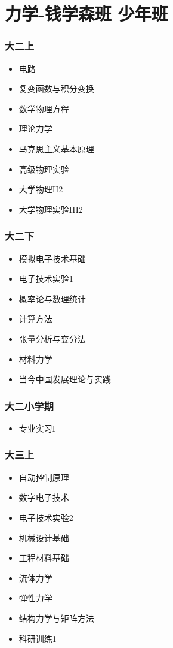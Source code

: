 \documentclass[a4paper, 12pt]{article}
\begin{document}
	\part*{力学-钱学森班 少年班}{
		\section*{大二上}
		\begin{itemize}
			\item 电路
			\item 复变函数与积分变换
			\item 数学物理方程
			\item 理论力学
			\item 马克思主义基本原理
			\item 高级物理实验
			\item 大学物理II2
			\item 大学物理实验III2
		\end{itemize}
		
		\section*{大二下}
		\begin{itemize}
			\item 模拟电子技术基础
			\item 电子技术实验1
			\item 概率论与数理统计
			\item 计算方法
			\item 张量分析与变分法
			\item 材料力学
			\item 当今中国发展理论与实践
		\end{itemize}
		
		\section*{大二小学期}
		\begin{itemize}
			\item 专业实习I
		\end{itemize}
		
		\section*{大三上}
		\begin{itemize}
			\item 自动控制原理
			\item 数字电子技术
			\item 电子技术实验2
			\item 机械设计基础
			\item 工程材料基础
			\item 流体力学
			\item 弹性力学
			\item 结构力学与矩阵方法
			\item 科研训练1
		\end{itemize}
		
}
\end{document}
